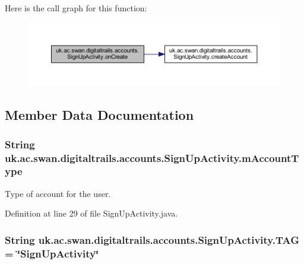 Here is the call graph for this function\+:
\nopagebreak
\begin{figure}[H]
\begin{center}
\leavevmode
\includegraphics[width=350pt]{classuk_1_1ac_1_1swan_1_1digitaltrails_1_1accounts_1_1_sign_up_activity_abdb5e9c3bc4c380148243c53deec8ef8_cgraph}
\end{center}
\end{figure}




\subsection{Member Data Documentation}
\hypertarget{classuk_1_1ac_1_1swan_1_1digitaltrails_1_1accounts_1_1_sign_up_activity_a7a7036d42bd7e430137fc06e363bec0a}{
\subsubsection[{m\+Account\+Type}]{\setlength{\rightskip}{0pt plus 5cm}String uk.\+ac.\+swan.\+digitaltrails.\+accounts.\+Sign\+Up\+Activity.\+m\+Account\+Type\hspace{0.3cm}{\ttfamily [private]}}}\label{classuk_1_1ac_1_1swan_1_1digitaltrails_1_1accounts_1_1_sign_up_activity_a7a7036d42bd7e430137fc06e363bec0a}


Type of account for the user. 



Definition at line 29 of file Sign\+Up\+Activity.\+java.

\hypertarget{classuk_1_1ac_1_1swan_1_1digitaltrails_1_1accounts_1_1_sign_up_activity_a69045d7b89a533e2e196e696dce43445}{
\subsubsection[{T\+A\+G}]{\setlength{\rightskip}{0pt plus 5cm}String uk.\+ac.\+swan.\+digitaltrails.\+accounts.\+Sign\+Up\+Activity.\+T\+A\+G = \char`\"{}Sign\+Up\+Activity\char`\"{}\hspace{0.3cm}{\ttfamily [private]}}}\label{classuk_1_1ac_1_1swan_1_1digitaltrails_1_1accounts_1_1_sign_up_activity_a69045d7b89a533e2e196e696dce43445}


